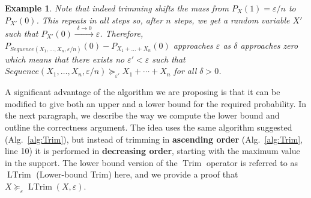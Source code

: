 \documentclass{article}
\newtheorem{example}{Example}
\DeclareMathOperator{\support}{support}
\DeclareMathOperator{\Trim}{Trim}
\DeclareMathOperator{\LTrim}{LTrim}
\begin{document}
\begin{example}
	Note that indeed trimming shifts the mass from $P_X(1)=\varepsilon/n$ to $P_{X'}(0)$.
	This repeats in all steps so, after $n$ steps, we get a random variable $X'$ such that $P_{X'}(0) \xrightarrow{\,\,\delta \to 0\,\,} \varepsilon$. Therefore, 
	$P_{Sequence(X_1,\dots,X_n,\varepsilon/n)}(0) {-} P_{X_1{+}\dots{+}X_n}(0)$
	approaches $\varepsilon$ as $\delta$ approaches zero
	which means that there exists no $\varepsilon' {<} \varepsilon$
	such that $Sequence(X_1,\dots,X_n,\varepsilon/n) \succeq_{\varepsilon'} X_1 + \cdots + X_n$ for all $\delta >0$.
	
\end{example}

A significant advantage of the algorithm we are proposing is that it can be modified to give both an upper and a lower bound for the required probability. In the next paragraph, we describe the way we compute the lower bound and outline the correctness argument. The idea uses the same algorithm suggested (Alg.~\ref{alg:Trim}), but instead of trimming in \textbf{ascending order} (Alg.~\ref{alg:Trim}, line 10) it is performed in \textbf{decreasing order}, starting with the maximum value in the support. The lower bound version of the $\Trim$ operator is referred to as $\LTrim$ (Lower-bound Trim) here, and we provide a proof that $X\succeq_{\varepsilon}\LTrim(X,\varepsilon) $. 
%		
%		
%		
%		
%	
\end{document}
